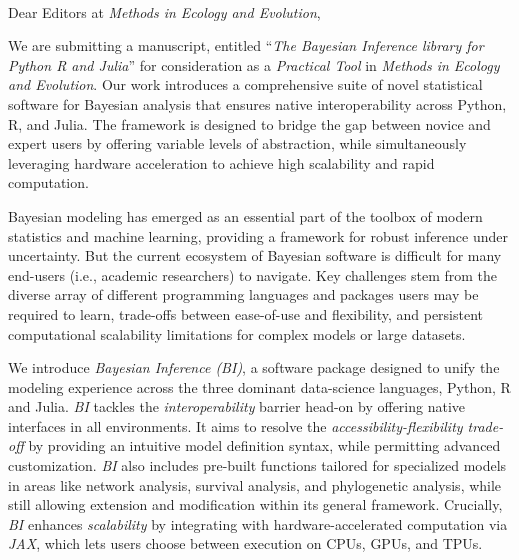 \documentclass[10pt,a4paper]{letter} %
\def\opening#1{\thispagestyle{empty}
{\centering\fromaddress \vspace{0.6in} \\ %
\hspace*{0.8\longindentation}\hspace*{\fill}\par} %
{\raggedright \toname \toaddress

\par} %
\vspace{0.4in} %
\noindent #1 %
}
\begin{document}

\begin{letter}
{

}

\opening{Dear Editors at \emph{Methods in Ecology and Evolution},}
 
We are submitting a manuscript, entitled “\emph{The Bayesian Inference library for Python R and Julia}” for consideration as a \emph{Practical Tool} in \emph{Methods in Ecology and Evolution}. Our work introduces a comprehensive suite of novel statistical software for Bayesian analysis that ensures native interoperability across Python, R, and Julia. The framework is designed to bridge the gap between novice and expert users by offering variable levels of abstraction, while simultaneously leveraging hardware acceleration to achieve high scalability and rapid computation.

Bayesian modeling has emerged as an essential part of the toolbox of modern statistics and machine learning, providing a framework for robust inference under uncertainty. But the current ecosystem of Bayesian software is difficult for many end-users (i.e., academic researchers) to navigate. Key challenges stem from the diverse array of different programming languages and packages users may be required to learn, trade-offs between ease-of-use and flexibility, and persistent computational scalability limitations for complex models or large datasets.

We introduce \textit{Bayesian Inference (BI)}, a software package designed to unify the modeling experience across the three dominant data-science languages, Python, R and Julia. \textit{BI} tackles the \textit{interoperability} barrier head-on by offering native interfaces in all environments. It aims to resolve the \textit{accessibility-flexibility trade-off} by providing an intuitive model definition syntax, while permitting advanced customization. \textit{BI} also includes pre-built functions tailored for specialized models in areas like network analysis, survival analysis, and phylogenetic analysis, while still allowing extension and modification within its general framework. Crucially, \textit{BI} enhances \textit{scalability} by integrating with hardware-accelerated computation via \textit{JAX}, which lets users choose between execution on CPUs, GPUs, and TPUs. 


\end{letter}
\end{document}
